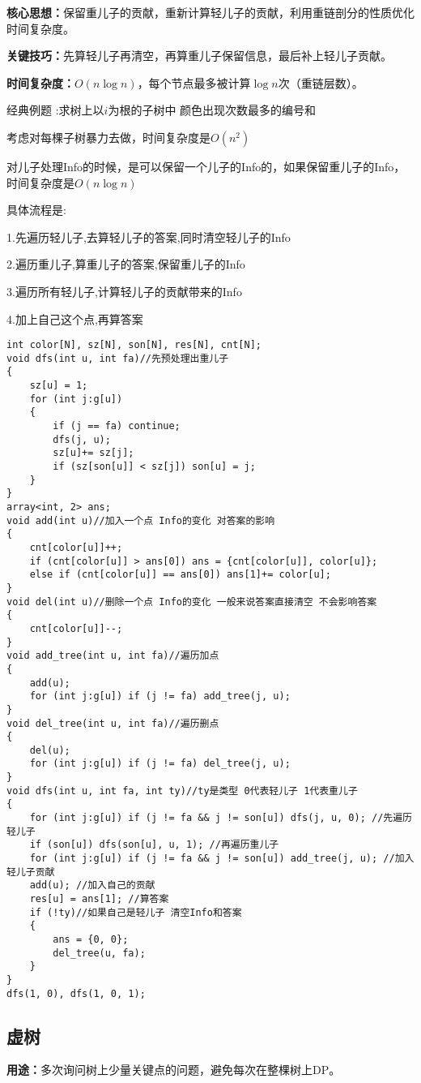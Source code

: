 \documentclass[a4paper,fontset=none]{ctexart}
\begin{document}
\textbf{核心思想：}保留重儿子的贡献，重新计算轻儿子的贡献，利用重链剖分的性质优化时间复杂度。

\textbf{关键技巧：}先算轻儿子再清空，再算重儿子保留信息，最后补上轻儿子贡献。

\textbf{时间复杂度：}$O(n\log n)$，每个节点最多被计算$\log n$次（重链层数）。

经典例题 :求树上以$i$为根的子树中 颜色出现次数最多的编号和

考虑对每棵子树暴力去做，时间复杂度是$O(n^2)$

对儿子处理Info的时候，是可以保留一个儿子的Info的，如果保留重儿子的Info，时间复杂度是$O(n\log n)$

具体流程是:

1.先遍历轻儿子,去算轻儿子的答案,同时清空轻儿子的Info

2.遍历重儿子,算重儿子的答案,保留重儿子的Info

3.遍历所有轻儿子,计算轻儿子的贡献带来的Info

4.加上自己这个点,再算答案

\begin{verbatim}
int color[N], sz[N], son[N], res[N], cnt[N];
void dfs(int u, int fa)//先预处理出重儿子
{
    sz[u] = 1;
    for (int j:g[u])
    {
        if (j == fa) continue;
        dfs(j, u);
        sz[u]+= sz[j];
        if (sz[son[u]] < sz[j]) son[u] = j;
    }
}
array<int, 2> ans;
void add(int u)//加入一个点 Info的变化 对答案的影响
{
    cnt[color[u]]++;
    if (cnt[color[u]] > ans[0]) ans = {cnt[color[u]], color[u]};
    else if (cnt[color[u]] == ans[0]) ans[1]+= color[u];
}
void del(int u)//删除一个点 Info的变化 一般来说答案直接清空 不会影响答案
{
    cnt[color[u]]--;
}
void add_tree(int u, int fa)//遍历加点
{
    add(u);
    for (int j:g[u]) if (j != fa) add_tree(j, u);
}
void del_tree(int u, int fa)//遍历删点
{
    del(u);
    for (int j:g[u]) if (j != fa) del_tree(j, u);
}
void dfs(int u, int fa, int ty)//ty是类型 0代表轻儿子 1代表重儿子
{
    for (int j:g[u]) if (j != fa && j != son[u]) dfs(j, u, 0); //先遍历轻儿子
    if (son[u]) dfs(son[u], u, 1); //再遍历重儿子
    for (int j:g[u]) if (j != fa && j != son[u]) add_tree(j, u); //加入轻儿子贡献
    add(u); //加入自己的贡献
    res[u] = ans[1]; //算答案
    if (!ty)//如果自己是轻儿子 清空Info和答案
    {
        ans = {0, 0};
        del_tree(u, fa);
    }
}
dfs(1, 0), dfs(1, 0, 1);
\end{verbatim}
\subsection{虚树}
\textbf{用途：}多次询问树上少量关键点的问题，避免每次在整棵树上DP。
\end{document}
